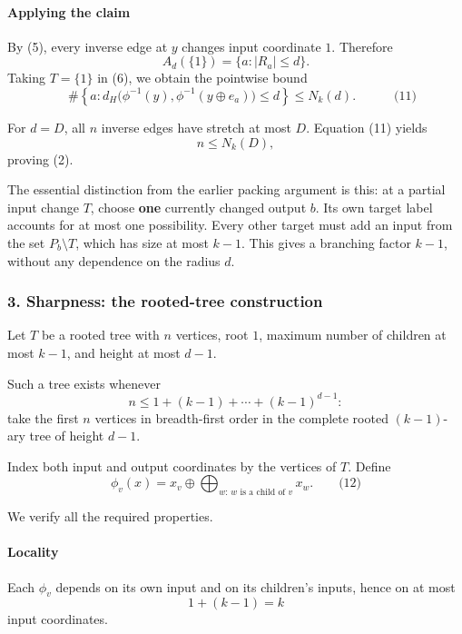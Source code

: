 \documentclass[
  11pt,
  a4paper,
]{article}
\begin{document}
\paragraph{Applying the claim}\label{applying-the-claim}

By (5), every inverse edge at \(y\) changes input coordinate \(1\).
Therefore \[
A_d(\{1\})=\{a:|R_a|\le d\}.
\] Taking \(T=\{1\}\) in (6), we obtain the pointwise bound \[
\boxed{\quad
\#\left\{a:
d_H\bigl(\phi^{-1}(y),\phi^{-1}(y\oplus e_a)\bigr)
\le d
\right\}
\le N_k(d).
\quad}                                                \qquad\text{(11)}
\]

For \(d=D\), all \(n\) inverse edges have stretch at most \(D\).
Equation (11) yields \[
n\le N_k(D),
\] proving (2).

The essential distinction from the earlier packing argument is this: at
a partial input change \(T\), choose \textbf{one} currently changed
output \(b\). Its own target label accounts for at most one possibility.
Every other target must add an input from the set \(P_b\setminus T\),
which has size at most \(k-1\). This gives a branching factor \(k-1\),
without any dependence on the radius \(d\).

\subsubsection{3. Sharpness: the rooted-tree
construction}\label{sharpness-the-rooted-tree-construction}

Let \(T\) be a rooted tree with \(n\) vertices, root \(1\), maximum
number of children at most \(k-1\), and height at most \(d-1\).

Such a tree exists whenever \[
n\le 1+(k-1)+\cdots+(k-1)^{d-1}:
\] take the first \(n\) vertices in breadth-first order in the complete
rooted \((k-1)\)-ary tree of height \(d-1\).

Index both input and output coordinates by the vertices of \(T\). Define
\[
\phi_v(x)
=
x_v\oplus\bigoplus_{w:\,w\text{ is a child of }v}x_w. \qquad\text{(12)}
\]

We verify all the required properties.

\paragraph{Locality}\label{locality}

Each \(\phi_v\) depends on its own input and on its children's inputs,
hence on at most \[
1+(k-1)=k
\] input coordinates.
\end{document}

